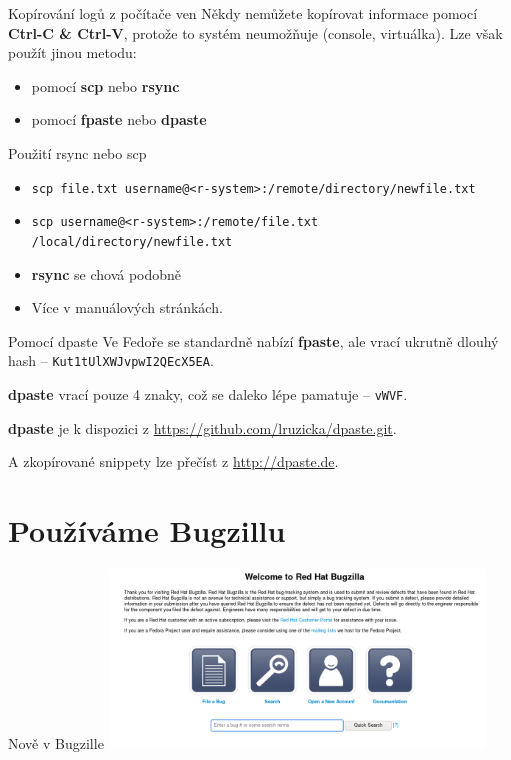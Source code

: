 \documentclass[12pt,aspectratio=169]{beamer}
\begin{document}
\begin{frame}{Kopírování logů z počítače ven}
Někdy nemůžete kopírovat informace pomocí \textbf{Ctrl-C \& Ctrl-V}, protože to systém neumožňuje (console, virtuálka). Lze však použít jinou metodu:

\begin{itemize}
 \item pomocí \textbf{scp} nebo \textbf{rsync}
 \item pomocí \textbf{fpaste} nebo \textbf{dpaste}	
\end{itemize}
\end{frame}

\begin{frame}{Použití rsync nebo scp}
\begin{itemize}
	\item {\color{blue} \texttt{scp file.txt username@<r-system>:/remote/directory/newfile.txt}}
	\item {\color{blue} \texttt{scp username@<r-system>:/remote/file.txt /local/directory/newfile.txt}}
	\item \textbf{rsync} se chová podobně
	\item Více v manuálových stránkách.
\end{itemize}
\end{frame}

\begin{frame}{Pomocí dpaste}
Ve Fedoře se standardně nabízí \textbf{fpaste}, ale vrací ukrutně dlouhý hash -- \texttt{Kut1tUlXWJvpwI2QEcX5EA}. 

\vspace{5pt}

\textbf{dpaste} vrací pouze 4 znaky, což se daleko lépe pamatuje -- \texttt{vWVF}.

\vspace{5pt}

\textbf{dpaste} je k dispozici z {\color{blue}\url{https://github.com/lruzicka/dpaste.git}}.

\vspace{5pt}

A zkopírované snippety lze přečíst z {\color{blue}\url{http://dpaste.de}}.

\end{frame}

\section{Používáme Bugzillu}
\begin{frame}{Nově v Bugzille}
\includegraphics[width=10cm]{images/bz_new.png}
\end{frame}
\end{document}
